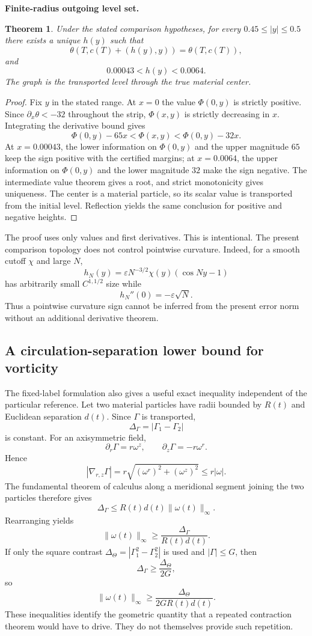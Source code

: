 \documentclass[11pt]{article}
\newtheorem{theorem}{Theorem}[section]\newtheorem{proposition}[theorem]{Proposition}
\theoremstyle{definition}\newtheorem{definition}[theorem]{Definition}\newtheorem{problem}[theorem]{Problem}
\theoremstyle{remark}\newtheorem{remark}[theorem]{Remark}
\begin{document}
\medskip
\noindent\textbf{Finite-radius outgoing level set.}
\begin{theorem}\label{thm:outgoing-contour}
Under the stated comparison hypotheses, for every $0.45\le|y|\le0.5$ there exists a unique $h(y)$ such that
\[
\theta(T,c(T)+(h(y),y))=\theta(T,c(T)),
\]
and
\[
0.00043<h(y)<0.0064.
\]
The graph is the transported level through the true material center.
\end{theorem}
\begin{proof}
Fix $y$ in the stated range.  At $x=0$ the value $\Phi(0,y)$ is strictly positive.  Since $\partial_x\theta<-32$ throughout the strip, $\Phi(x,y)$ is strictly decreasing in $x$.  Integrating the derivative bound gives
\[
\Phi(0,y)-65x<\Phi(x,y)<\Phi(0,y)-32x.
\]
At $x=0.00043$, the lower information on $\Phi(0,y)$ and the upper magnitude $65$ keep the sign positive with the certified margins; at $x=0.0064$, the upper information on $\Phi(0,y)$ and the lower magnitude $32$ make the sign negative.  The intermediate value theorem gives a root, and strict monotonicity gives uniqueness.  The center is a material particle, so its scalar value is transported from the initial level.  Reflection yields the same conclusion for positive and negative heights.
\end{proof}

The proof uses only values and first derivatives.  This is intentional.  The present comparison topology does not control pointwise curvature.  Indeed, for a smooth cutoff $\chi$ and large $N$,
\[
h_N(y)=\varepsilon N^{-3/2}\chi(y)(\cos Ny-1)
\]
has arbitrarily small $C^{1,1/2}$ size while
\[
h_N''(0)=-\varepsilon\sqrt N.
\]
Thus a pointwise curvature sign cannot be inferred from the present error norm without an additional derivative theorem.

\subsection{A circulation-separation lower bound for vorticity}
The fixed-label formulation also gives a useful exact inequality independent of the particular reference.  Let two material particles have radii bounded by $R(t)$ and Euclidean separation $d(t)$.  Since $\Gamma$ is transported,
\[
\Delta_\Gamma=|\Gamma_1-\Gamma_2|
\]
is constant.  For an axisymmetric field,
\[
\partial_r\Gamma=r\omega^z,
\qquad
\partial_z\Gamma=-r\omega^r.
\]
Hence
\[
|\nabla_{r,z}\Gamma|
=r\sqrt{(\omega^r)^2+(\omega^z)^2}
\le r|\omega|.
\]
The fundamental theorem of calculus along a meridional segment joining the two particles therefore gives
\[
\Delta_\Gamma
\le R(t)d(t)\|\omega(t)\|_\infty.
\]
Rearranging yields
\[
\boxed{
\|\omega(t)\|_\infty
\ge\frac{\Delta_\Gamma}{R(t)d(t)}.}
\]
If only the square contrast $\Delta_\Theta=|\Gamma_1^2-\Gamma_2^2|$ is used and $|\Gamma|\le G$, then
\[
\Delta_\Gamma\ge\frac{\Delta_\Theta}{2G},
\]
so
\[
\boxed{
\|\omega(t)\|_\infty
\ge\frac{\Delta_\Theta}{2G R(t)d(t)}.}
\]
These inequalities identify the geometric quantity that a repeated contraction theorem would have to drive.  They do not themselves provide such repetition.
\end{document}
